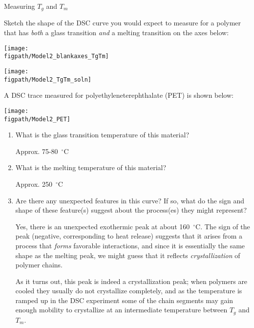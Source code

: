 \begin{activity}{Measuring $T_g$ and $T_m$}
\begin{ctqs}
	\question Sketch the shape of the DSC curve you would expect to measure for a polymer that has \emph{both} a glass transition \emph{and} a melting transition on the axes below:
	
		\vspace{6pt}
		\begin{solution}[2.5in]{
			\centerline{\texttt{[image: \\figpath/Model2\_blankaxes\_TgTm]}}
		}
			\centerline{\texttt{[image: \\figpath/Model2\_TgTm\_soln]}}
		\end{solution}
	
	\clearpage
	\question A DSC trace measured for polyethyleneterephthalate (PET) is shown below:
	
		\vspace{6pt}
		\centerline{\texttt{[image: \\figpath/Model2\_PET]}}
	
		\begin{enumerate}
			\item What is the glass transition temperature of this material?
			
				\begin{solution}[0.5in]{}
					Approx. 75-80~$^\circ$C
				\end{solution}
			
			\item What is the melting temperature of this material?
			
				\begin{solution}[0.5in]{}
					Approx. 250~$^\circ$C
				\end{solution}
			
			\item Are there any unexpected features in this curve? If so, what do the sign and shape of these feature(s) suggest about the process(es) they might represent?
			
				\begin{solution}[2in]{}
					Yes, there is an unexpected exothermic peak at about 160~$^\circ$C.  The sign of the peak (negative, corresponding to heat release) suggests that it arises from a process that \emph{forms} favorable interactions, and since it is essentially the same shape as the melting peak, we might guess that it reflects \emph{crystallization} of polymer chains.
					
					As it turns out, this peak is indeed a crystallization peak; when polymers are cooled they usually do not crystallize completely, and as the temperature is ramped up in the DSC experiment some of the chain segments may gain enough mobility to crystallize at an intermediate temperature between $T_g$ and $T_m$.
				\end{solution}
		\end{enumerate}
	

\end{ctqs}
\end{activity}
